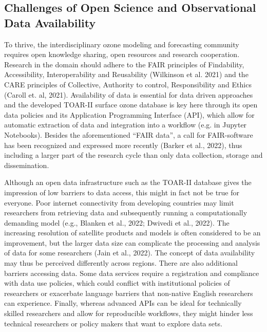 \documentclass[gmd, manuscript]{copernicus}
\begin{document}
\subsection{Challenges of Open Science and Observational Data Availability}

To thrive, the interdisciplinary ozone modeling and forecasting community requires open knowledge sharing, open resources and research cooperation. Research in the domain should adhere to the FAIR principles of Findability, Accessibility, Interoperability and Reusability (Wilkinson et al. 2021) and the CARE principles of Collective, Authority to control, Responsibility and Ethics (Caroll et. al, 2021). Availability of data is essential for data driven approaches and the developed TOAR-II surface ozone database is key here through its open data policies and its Application Programming Interface (API), which allow  for automatic extraction of data and integration into a workflow (e.g. in Jupyter Notebooks). Besides the aforementioned “FAIR data”, a call for FAIR-software has been recognized and expressed more recently (Barker et al., 2022), thus including a larger part of the research cycle than only data collection, storage and dissemination.

Although an open data infrastructure such as the TOAR-II database gives the impression of low barriers to data access, this might in fact not be true for everyone. Poor internet connectivity from developing countries may limit researchers from retrieving data and subsequently running a computationally demanding model (e.g., Blanken et al., 2022; Dwivedi et al., 2022). The increasing resolution of satellite products and models is often considered to be an improvement, but the larger data size can complicate the processing and analysis of data for some researchers (Jain et al., 2022). The concept of data availability may thus be perceived differently across regions. There are also additional barriers accessing data. Some data services require a registration and compliance with data use policies, which could conflict with institutional policies of researchers or exacerbate language barriers that non-native English researchers can experience. Finally, whereas advanced APIs can be ideal for technically skilled researchers and allow for reproducible workflows, they might hinder less technical researchers or policy makers that want to explore data sets.
\end{document}
